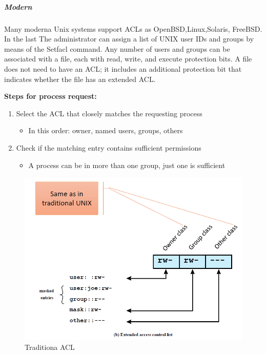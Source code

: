 \documentclass{article}
\begin{document}
                            \subparagraph{Modern}
                            Many moderna Unix systems support ACLs as OpenBSD,Linux,Solaris, FreeBSD. In the last The administrator can assign a list of UNIX user IDs and groups by means of the Setfacl command. Any number of users and groups can be associated with a file, each with read, write, and execute protection bits. A file does not need to have an ACL; it includes an additional protection bit that indicates whether the file has an extended ACL.
                            
                                \textbf{Steps for process request:}\\
                                \begin{enumerate}
                                    \item Select the ACL that closely matches the requesting process
                                    \begin{itemize}
                                        \item In this order: owner, named users, groups, others
                                    \end{itemize}
                                    \item Check if the matching entry contains sufficient permissions
                                    \begin{itemize}
                                        \item A process can be in more than one group, just one is sufficient
                                    \end{itemize}
                                \end{enumerate}
                                \begin{figure}[h]
                                    \begin{center}
                                        \includegraphics[scale=0.6]{../immagini/eacl.png}
                                    \end{center}
                                    \caption{Traditiona ACL}
                                \end{figure}
\end{document}

